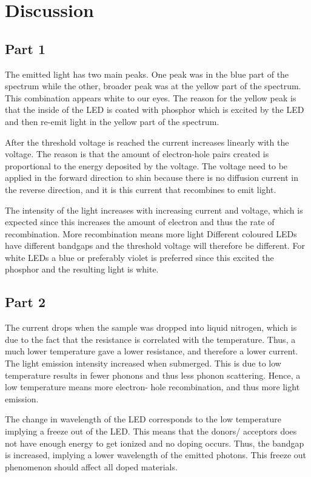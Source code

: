 \section{Discussion}
\subsection{Part 1}
The emitted light has two main peaks. One peak was in the blue part of the spectrum while the other, broader peak was at the yellow part of the spectrum. This combination appears white to our eyes. The reason for the yellow peak is that the inside of the LED is coated with phosphor which is excited by the LED and then re-emit light in the yellow part of the spectrum.

After the threshold voltage is reached the current increases linearly with the voltage. The reason is that the amount of electron-hole pairs created is proportional to the energy deposited by the voltage. The voltage need to be applied in the forward direction to shin because there is no diffusion current in the reverse direction, and it is this current that recombines to emit light.

The intensity of the light increases with increasing current and voltage, which is expected since this increases the amount of electron and thus the rate of recombination. More recombination means more light Different coloured LEDs have different bandgaps and the threshold voltage will therefore be different. For white LEDs a blue or preferably violet is preferred since this excited the phosphor and the resulting light is white.

\subsection{Part 2}
The current drops when the sample was dropped into liquid nitrogen, which is due to the fact that the resistance is correlated with the temperature. Thus, a much lower temperature gave a lower resistance, and therefore a lower current. The light emission intensity increased when submerged. This is due to low temperature results in fewer phonons and thus less phonon scattering. Hence, a low temperature means more electron- hole recombination, and thus more light emission. 

The change in wavelength of the LED corresponds to the low temperature implying a freeze out of the LED. This means that the donors/ acceptors does not have enough energy to get ionized and no doping occurs. Thus, the bandgap is increased, implying a lower wavelength of the emitted photons. This freeze out phenomenon should affect all doped materials. 



